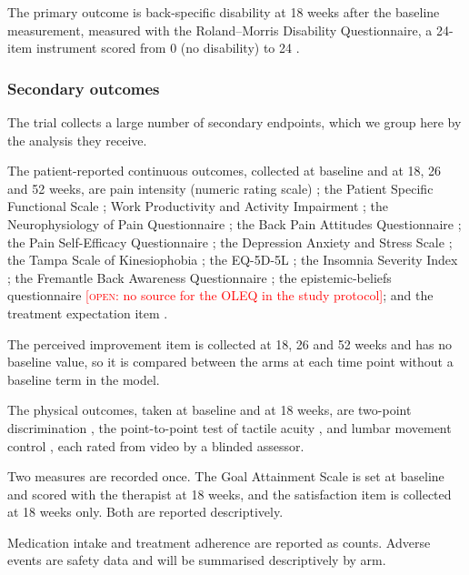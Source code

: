 \documentclass[11pt,a4paper]{article}
\newcommand{\open}[1]{\textcolor{red}{[\textsc{open}: #1]}}
\begin{document}
The primary outcome is back-specific disability at 18 weeks after the
baseline measurement, measured with the Roland--Morris Disability
Questionnaire, a 24-item instrument scored from 0 (no disability) to 24
\citep{roland2000, chiarotto2016}.

\subsubsection{Secondary outcomes}
\label{sec:secondary}

The trial collects a large number of secondary endpoints, which we group
here by the analysis they receive.

The patient-reported continuous outcomes, collected at baseline and at 18,
26 and 52 weeks, are pain intensity (numeric rating scale)
\citep{hawker2011}; the Patient Specific Functional Scale
\citep{heldmann2015}; Work Productivity and Activity Impairment
\citep{reilly1993}; the Neurophysiology of Pain Questionnaire
\citep{richter2019}; the Back Pain Attitudes Questionnaire
\citep{darlow2014}; the Pain Self-Efficacy Questionnaire \citep{mangels2009};
the Depression Anxiety and Stress Scale \citep{nilges2015}; the Tampa Scale
of Kinesiophobia \citep{rusu2014}; the EQ-5D-5L \citep{herdman2011}; the
Insomnia Severity Index \citep{dieck2018}; the Fremantle Back Awareness
Questionnaire \citep{ehrenbrusthoff2018}; the epistemic-beliefs questionnaire
\open{no source for the OLEQ in the study protocol}; and the treatment
expectation item \citep{barth2019}.

The perceived improvement item is collected at 18, 26 and 52 weeks and has no
baseline value, so it is compared between the arms at each time point without
a baseline term in the model.

The physical outcomes, taken at baseline and at 18 weeks, are two-point
discrimination \citep{catley2013}, the point-to-point test of tactile
acuity \citep{adamczyk2016}, and lumbar movement control
\citep{luomajoki2007, luomajoki2008}, each rated from video by a blinded
assessor.

Two measures are recorded once. The Goal Attainment Scale
\citep{turnerstokes2009} is set at baseline
and scored with the therapist at 18 weeks, and the satisfaction item is
collected at 18 weeks only. Both are reported
descriptively.

Medication intake and treatment adherence are reported as counts. Adverse
events are safety data and will be summarised descriptively by arm.
\end{document}
